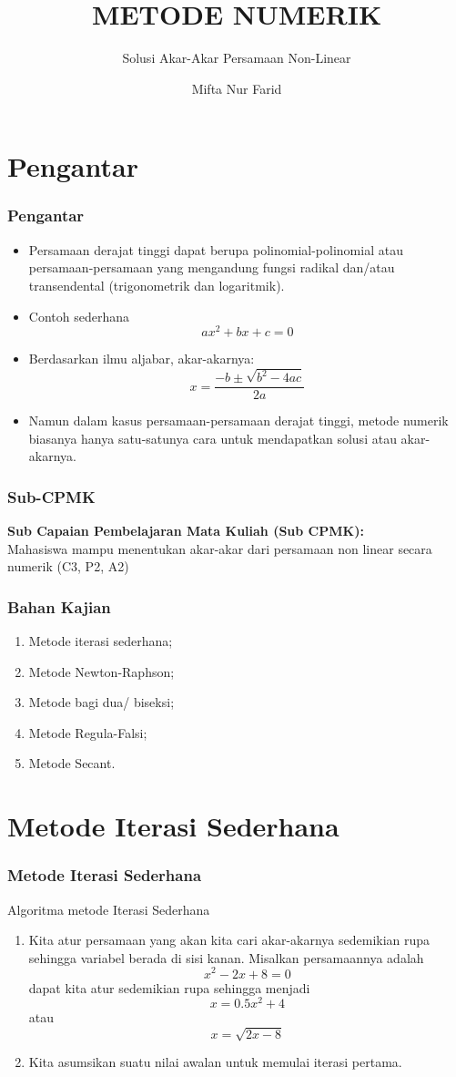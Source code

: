 \documentclass[pdflatex,compress,mathserif]{beamer}
\title{METODE NUMERIK}
\subtitle{Solusi Akar-Akar Persamaan Non-Linear}
\author{Mifta Nur Farid}
\begin{document}
\maketitle

\section{Pengantar}

\begin{frame}
	\frametitle{Pengantar}
	\begin{itemize}
		\item Persamaan derajat tinggi dapat berupa polinomial-polinomial atau persamaan-persamaan yang mengandung fungsi radikal dan/atau transendental (trigonometrik dan logaritmik).
		\item Contoh sederhana
		$$ ax^2 + bx + c = 0 $$
		\item Berdasarkan ilmu aljabar, akar-akarnya:
		$$ x = \frac{-b \pm \sqrt{b^2 - 4ac}}{2a} $$
		\item Namun dalam kasus persamaan-persamaan derajat tinggi, metode numerik biasanya hanya satu-satunya cara untuk mendapatkan solusi atau akar-akarnya.
	\end{itemize}
\end{frame}

\begin{frame}
	\frametitle{Sub-CPMK}
	\textbf{Sub Capaian Pembelajaran Mata Kuliah (Sub CPMK):}\\Mahasiswa mampu menentukan akar-akar dari persamaan non linear secara numerik (C3, P2, A2)
\end{frame}

\begin{frame}
	\frametitle{Bahan Kajian}
	\begin{enumerate}
		\item Metode iterasi sederhana;
		\item Metode Newton-Raphson;
		\item Metode bagi dua/ biseksi;
		\item Metode Regula-Falsi;
		\item Metode Secant.
	\end{enumerate}
\end{frame}

\section{Metode Iterasi Sederhana}

\begin{frame}
	\frametitle{Metode Iterasi Sederhana}
	Algoritma metode Iterasi Sederhana
	\begin{enumerate}
		\item Kita atur persamaan yang akan kita cari akar-akarnya sedemikian rupa sehingga variabel berada di sisi kanan. Misalkan persamaannya adalah
		$$ x^2 - 2x + 8 = 0 $$
		dapat kita atur sedemikian rupa sehingga menjadi
		$$ x = 0.5x^2 + 4 $$ atau $$ x = \sqrt{2x-8} $$
		\item Kita asumsikan suatu nilai awalan untuk memulai iterasi pertama.
	\end{enumerate}
\end{frame}
\end{document}
